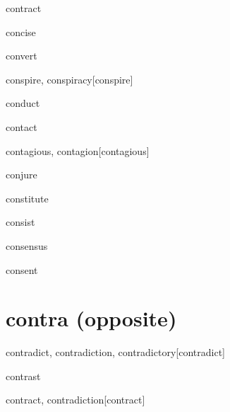 \begin{RefWord}{contract}
\end{RefWord}

\begin{RefWord}{concise}
\end{RefWord}

\begin{RefWord}{convert}
\end{RefWord}

\begin{RefWord}{conspire, conspiracy}[conspire]
\end{RefWord}

\begin{RefWord}{conduct}
\end{RefWord}

\begin{RefWord}{contact}
\end{RefWord}

\begin{RefWord}{contagious, contagion}[contagious]
\end{RefWord}

\begin{RefWord}{conjure}
\end{RefWord}

\begin{RefWord}{constitute}
\end{RefWord}

\begin{RefWord}{consist}
\end{RefWord}

\begin{RefWord}{consensus}
\end{RefWord}

\begin{RefWord}{consent}
\end{RefWord}


\section{contra (opposite)}

\begin{RefWord}{contradict, contradiction, contradictory}[contradict]
\end{RefWord}

\begin{RefWord}{contrast}
\end{RefWord}

\begin{DefWord}{contract, contradiction}[contract]
\end{DefWord}


